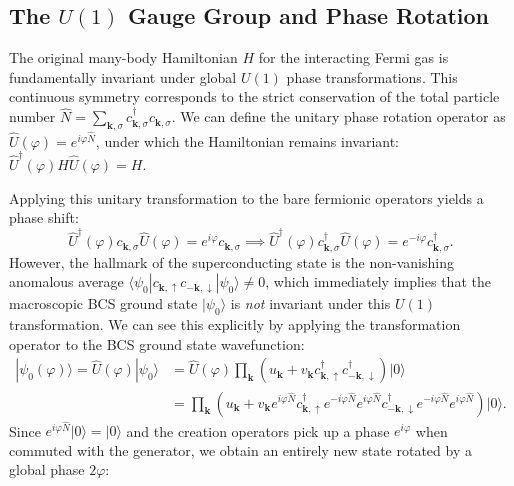 \subsection{The \( U(1) \) Gauge Group and Phase Rotation}

The original many-body Hamiltonian \( H \) for the interacting Fermi gas is fundamentally invariant under global \( U(1) \) phase transformations. This continuous symmetry corresponds to the strict conservation of the total particle number \( \hat{N} = \sum_{\mathbf{k},\sigma} c_{\mathbf{k},\sigma}^\dagger c_{\mathbf{k},\sigma} \). We can define the unitary phase rotation operator as \( \hat{U}(\varphi) = e^{i\varphi \hat{N}} \), under which the Hamiltonian remains invariant: \( \hat{U}^\dagger(\varphi) H \hat{U}(\varphi) = H \).

Applying this unitary transformation to the bare fermionic operators yields a phase shift:
\[
    \hat{U}^\dagger(\varphi) c_{\mathbf{k},\sigma} \hat{U}(\varphi) = e^{i\varphi} c_{\mathbf{k},\sigma} \implies \hat{U}^\dagger(\varphi) c_{\mathbf{k},\sigma}^\dagger \hat{U}(\varphi) = e^{-i\varphi} c_{\mathbf{k},\sigma}^\dagger.
\]
However, the hallmark of the superconducting state is the non-vanishing anomalous average \( \langle \psi_0 | c_{\mathbf{k},\uparrow} c_{-\mathbf{k},\downarrow} | \psi_0 \rangle \neq 0 \), which immediately implies that the macroscopic BCS ground state \( |\psi_0\rangle \) is \emph{not} invariant under this \( U(1) \) transformation. We can see this explicitly by applying the transformation operator to the BCS ground state wavefunction:
\[
    \begin{aligned}
        |\psi_0(\varphi)\rangle = \hat{U}(\varphi) |\psi_0\rangle & = \hat{U}(\varphi) \prod_{\mathbf{k}} \left( u_{\mathbf{k}} + v_{\mathbf{k}} c_{\mathbf{k},\uparrow}^\dagger c_{-\mathbf{k},\downarrow}^\dagger \right) |0\rangle                                                                                            \\
                                                                  & = \prod_{\mathbf{k}} \left( u_{\mathbf{k}} + v_{\mathbf{k}} e^{i\varphi \hat{N}} c_{\mathbf{k},\uparrow}^\dagger e^{-i\varphi \hat{N}} e^{i\varphi \hat{N}} c_{-\mathbf{k},\downarrow}^\dagger e^{-i\varphi \hat{N}} e^{i\varphi \hat{N}} \right) |0\rangle.
    \end{aligned}
\]
Since \( e^{i\varphi \hat{N}} |0\rangle = |0\rangle \) and the creation operators pick up a phase \( e^{i\varphi} \) when commuted with the generator, we obtain an entirely new state rotated by a global phase \( 2\varphi \):
